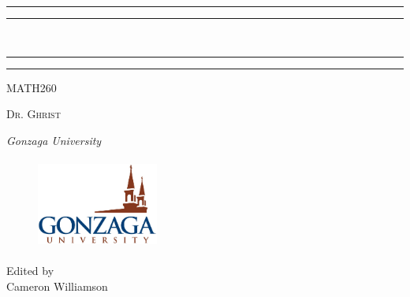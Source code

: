 \begin{titlepage}
  \rule{\textwidth}{1.6pt}\vspace*{-\baselineskip}\vspace*{2pt} %
  \rule{\textwidth}{0.4pt} %
  
  \vspace{0.75\baselineskip} %
  
  {\huge {}\\} %
  
  \vspace{0.75\baselineskip} %
  
  \rule{\textwidth}{0.4pt}\vspace*{-\baselineskip}\vspace{3.2pt} %
  \rule{\textwidth}{1.6pt} %
  
  \vspace{2\baselineskip} %
  
  
  \LARGE{MATH260} 
  
  \vspace*{3\baselineskip} %
  
  
  
  \vspace{0.5\baselineskip} 
  
  {\scshape   \LARGE Dr. Ghrist\\ } %
  
  \vspace{0.2\baselineskip} 
  
  \textit{\Large Gonzaga University} 
  
  \vfill 
  
  
  \begin{figure}[!h]
      \centering
      \includegraphics[width = 4cm, height= 3cm]{resource/images/Gonzaga_University_Logo.jpg}%
  \end{figure}
  \vspace{0.3\baselineskip} 
  
  
  {\large Edited by\\  Cameron Williamson}
  \end{titlepage}